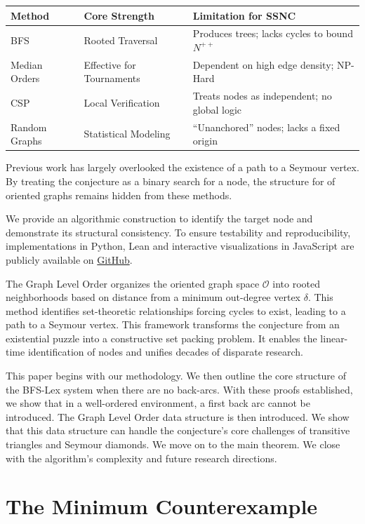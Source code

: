 \documentclass[AMS, Times1COL]{article} %
\theoremstyle{definition}
\begin{document}
	\begin{tabular}{|l|l|l|}
		\hline
		\textbf{Method} & \textbf{Core Strength} & \textbf{Limitation for SSNC}\\
		\hline
		BFS & Rooted Traversal & Produces trees; lacks cycles to bound $N^{++}$ \\
		\hline
		Median Orders & Effective for Tournaments & Dependent on high edge density; NP-Hard\\
		\hline
		CSP & Local Verification & Treats nodes as independent; no global logic \\
		\hline
		Random Graphs & Statistical Modeling & ``Unanchored'' nodes; lacks a fixed origin \\
		\hline
	\end{tabular}
	
	Previous work has largely overlooked the existence of a path to a Seymour vertex. By treating the conjecture as a binary search for a node, the structure for of oriented graphs remains hidden from these methods. 
	
	We provide an algorithmic construction to identify the target node and demonstrate its structural consistency. To ensure testability and reproducibility, implementations in Python, Lean and interactive visualizations in JavaScript are publicly available on \href{https://github.com/cgcharles7/ssnc
	}{GitHub}.
	
	The Graph Level Order organizes the oriented graph space $\mathcal{O}$ into rooted neighborhoods based on distance from a minimum out-degree vertex $\delta$. This method identifies set-theoretic relationships forcing cycles to exist, leading to a path to a Seymour vertex. This framework transforms the conjecture from an existential puzzle into a constructive set packing problem. It enables the linear-time identification of nodes and unifies decades of disparate research.
	
	This paper begins with our methodology. We then outline the core structure of the BFS-Lex system when there are no back-arcs. With these proofs established, we show that in a well-ordered environment, a first back arc cannot be introduced. The Graph Level Order data structure is then introduced. We show that this data structure can handle the conjecture's core challenges of transitive triangles and Seymour diamonds. We move on to the main theorem. We close with the algorithm's complexity and future research directions.
	
	\section{The Minimum Counterexample}\label{cont}
	
\end{document}
